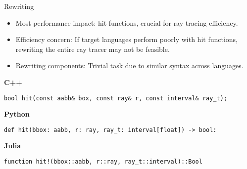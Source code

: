 \begin{frame}[fragile]{Rewriting}
    \begin{itemize}
        \item Most performance impact: hit functions, crucial for ray tracing efficiency.
        \pause
        \item Efficiency concern: If target languages perform poorly with hit functions, rewriting the entire ray tracer may not be feasible.
        \pause
        \item Rewriting components: Trivial task due to similar syntax across languages.
    \end{itemize}

\textbf{C++}
\begin{lstlisting}
bool hit(const aabb& box, const ray& r, const interval& ray_t);
\end{lstlisting}

\textbf{Python}
\begin{lstlisting}
def hit(bbox: aabb, r: ray, ray_t: interval[float]) -> bool:
\end{lstlisting} 

\textbf{Julia}
\begin{lstlisting}
function hit!(bbox::aabb, r::ray, ray_t::interval)::Bool
\end{lstlisting}
    
\end{frame}